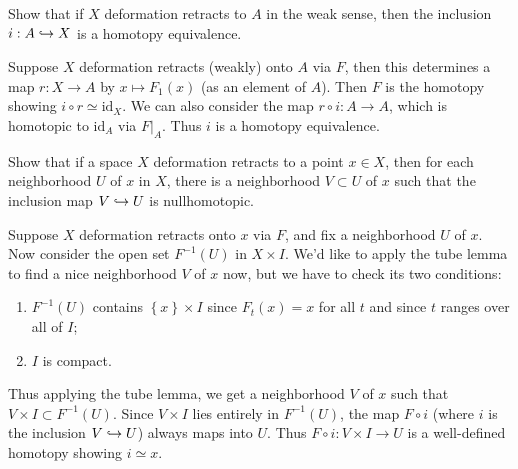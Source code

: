 \documentclass[twoside,10pt]{article}
\begin{document}

\begin{exer}[0: 4]
Show that if $X$ deformation retracts to $A$ in the weak sense, then the inclusion $i: A \hookrightarrow X$ is a homotopy equivalence.
\end{exer}

Suppose $X$ deformation retracts (weakly) onto $A$ via $F$, then this determines a map $r:X\to A$ by $x \mapsto F_1(x)$ (as an element of $A$). Then $F$ is the homotopy showing $i \circ r \simeq \text{id}_{X}$. We can also consider the map $r \circ i : A\to A$, which is homotopic to $\text{id}_{A}$ via $F|_{A}$. Thus $i$ is a homotopy equivalence.

\newpage

\begin{exer}[0: 5]
Show that if a space $X$ deformation retracts to a point $x \in X$, then for each neighborhood $U$ of $x$ in $X$, there is a neighborhood $V \subset U$ of $x$ such that the inclusion map $V \hookrightarrow U$ is nullhomotopic.
\end{exer}

Suppose $X$ deformation retracts onto $x$ via $F$, and fix a neighborhood $U$ of $x$. Now consider the open set $F^{-1}(U)$ in $X\times I$. We'd like to apply the tube lemma to find a nice neighborhood $V$ of $x$ now, but we have to check its two conditions:
\begin{enumerate}
	\item $F^{-1}(U)$ contains $\left\{ x \right\}\times I$ since $F_t(x) =x$ for all $t$ and since $t$ ranges over all of $I$;
	\item $I$ is compact.
\end{enumerate}
Thus applying the tube lemma, we get a neighborhood $V$ of $x$ such that $V \times I \subset F^{-1}(U)$. Since $V \times I$ lies entirely in $F^{-1}(U)$, the map $F\circ i$ (where $i$ is the inclusion $V\hookrightarrow U$) always maps into $U$. Thus $F\circ i:V \times I \to U$ is a well-defined homotopy showing $i \simeq x$.

\newpage
\end{document}
